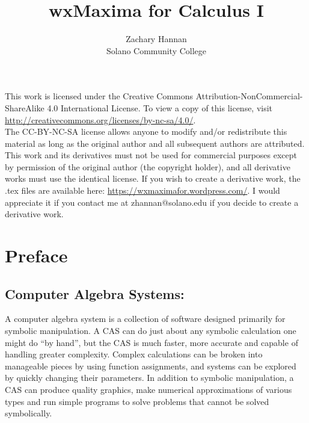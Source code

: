 \documentclass[10.5pt,twoside]{report}
\theoremstyle{definition}
\begin{document}
\title{wxMaxima for Calculus I}

\author{Zachary Hannan\\ Solano Community College}



\date{}

\maketitle

\pagebreak
\vspace*{\fill}

This work is licensed under the Creative Commons Attribution-NonCommercial-ShareAlike 4.0 International License. To view a copy of this license, visit \url{http://creativecommons.org/licenses/by-nc-sa/4.0/}.
${}$\\

The CC-BY-NC-SA license allows anyone to modify and/or redistribute this material as long as the original author and all subsequent authors are attributed.  This work and its derivatives must not be used for commercial purposes except by permission of the original author (the copyright holder), and all derivative works must use the identical license. If you wish to create a derivative work, the .tex files are available here:  \url{https://wxmaximafor.wordpress.com/}.  I would appreciate  it if you contact me at zhannan@solano.edu if you decide to create a derivative work.




\vspace*{\fill}
\pagebreak
{}
\setcounter{page}{3}

\dominitoc
\tableofcontents
\setcounter{chapter}{-1}



\pagebreak

\chapter*{Preface}

\section*{\large{Computer Algebra Systems:}}

A computer algebra system is a collection of software designed primarily for symbolic manipulation.  A CAS can do just about any symbolic calculation one might do ``by hand'', but the CAS is much faster, more accurate and capable of handling greater complexity.  Complex calculations can be broken into manageable pieces by using function assignments, and systems can be explored by quickly changing their parameters.  In addition to symbolic manipulation, a CAS can produce quality graphics, make numerical approximations of various types and run simple programs to solve problems that cannot be solved symbolically.
\end{document}
